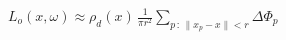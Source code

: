 \documentclass[border=6pt]{standalone}
\begin{document}
\color{black}
\(\displaystyle
L_o(x,\omega)
\approx
\rho_d(x)\,
\frac{1}{\pi r^2}
\sum_{p\,:\,\lVert x_p-x\rVert < r}
\Delta\Phi_p
\)
\end{document}

